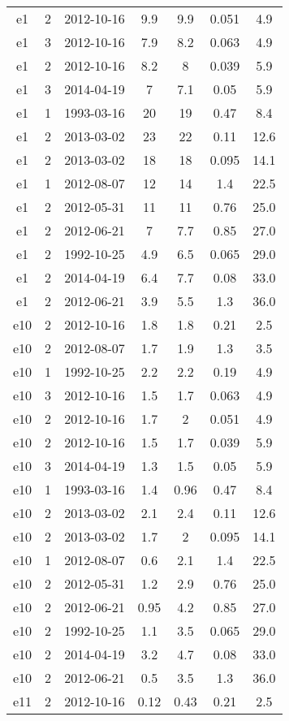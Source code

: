 \begin{table*}[htp]
\begin{tabular}{ccccccc}
e1 & 2 & 2012-10-16 & 9.9 & 9.9 & 0.051 & 4.9 \\
e1 & 3 & 2012-10-16 & 7.9 & 8.2 & 0.063 & 4.9 \\
e1 & 2 & 2012-10-16 & 8.2 & 8 & 0.039 & 5.9 \\
e1 & 3 & 2014-04-19 & 7 & 7.1 & 0.05 & 5.9 \\
e1 & 1 & 1993-03-16 & 20 & 19 & 0.47 & 8.4 \\
e1 & 2 & 2013-03-02 & 23 & 22 & 0.11 & 12.6 \\
e1 & 2 & 2013-03-02 & 18 & 18 & 0.095 & 14.1 \\
e1 & 1 & 2012-08-07 & 12 & 14 & 1.4 & 22.5 \\
e1 & 2 & 2012-05-31 & 11 & 11 & 0.76 & 25.0 \\
e1 & 2 & 2012-06-21 & 7 & 7.7 & 0.85 & 27.0 \\
e1 & 2 & 1992-10-25 & 4.9 & 6.5 & 0.065 & 29.0 \\
e1 & 2 & 2014-04-19 & 6.4 & 7.7 & 0.08 & 33.0 \\
e1 & 2 & 2012-06-21 & 3.9 & 5.5 & 1.3 & 36.0 \\
e10 & 2 & 2012-10-16 & 1.8 & 1.8 & 0.21 & 2.5 \\
e10 & 2 & 2012-08-07 & 1.7 & 1.9 & 1.3 & 3.5 \\
e10 & 1 & 1992-10-25 & 2.2 & 2.2 & 0.19 & 4.9 \\
e10 & 3 & 2012-10-16 & 1.5 & 1.7 & 0.063 & 4.9 \\
e10 & 2 & 2012-10-16 & 1.7 & 2 & 0.051 & 4.9 \\
e10 & 2 & 2012-10-16 & 1.5 & 1.7 & 0.039 & 5.9 \\
e10 & 3 & 2014-04-19 & 1.3 & 1.5 & 0.05 & 5.9 \\
e10 & 1 & 1993-03-16 & 1.4 & 0.96 & 0.47 & 8.4 \\
e10 & 2 & 2013-03-02 & 2.1 & 2.4 & 0.11 & 12.6 \\
e10 & 2 & 2013-03-02 & 1.7 & 2 & 0.095 & 14.1 \\
e10 & 1 & 2012-08-07 & 0.6 & 2.1 & 1.4 & 22.5 \\
e10 & 2 & 2012-05-31 & 1.2 & 2.9 & 0.76 & 25.0 \\
e10 & 2 & 2012-06-21 & 0.95 & 4.2 & 0.85 & 27.0 \\
e10 & 2 & 1992-10-25 & 1.1 & 3.5 & 0.065 & 29.0 \\
e10 & 2 & 2014-04-19 & 3.2 & 4.7 & 0.08 & 33.0 \\
e10 & 2 & 2012-06-21 & 0.5 & 3.5 & 1.3 & 36.0 \\
e11 & 2 & 2012-10-16 & 0.12 & 0.43 & 0.21 & 2.5 \\

\end{tabular}
\end{table*}
